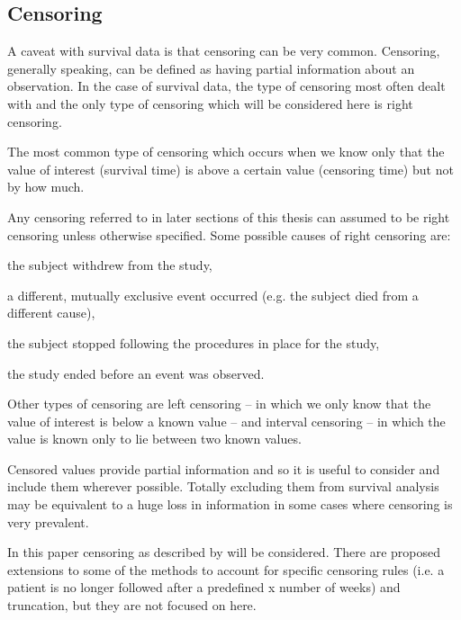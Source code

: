 \subsection{Censoring}\label{intro-censoring}

A caveat with survival data is that censoring can be very common. Censoring, generally speaking, can be defined as having partial information about an observation. In the case of survival data, the type of censoring most often dealt with and the only type of censoring which will be considered here is right censoring.

\begin{definition}\label{right-censoring}
The most common type of censoring which occurs when we know only that the value of interest (survival time) is above a certain value (censoring time) but not by how much.
\end{definition}

Any censoring referred to in later sections of this thesis can assumed to be right censoring unless otherwise specified. Some possible causes of right censoring are:
\begin{itemize}
\begin{spacing}{0}
    \item the subject withdrew from the study,
    \item a different, mutually exclusive event occurred (e.g. the subject died from a different cause),
    \item the subject stopped following the procedures in place for the study,
    \item the study ended before an event was observed.
\end{spacing}
\end{itemize}

Other types of censoring are left censoring -- in which we only know that the value of interest is below a known value -- and interval censoring -- in which the value is known only to lie between two known values.

Censored values provide partial information and so it is useful to consider and include them wherever possible. Totally excluding them from survival analysis may be equivalent to a huge loss in information in some cases where censoring is very prevalent.

In this paper censoring as described by  will be considered. There are proposed extensions to some of the methods to account for specific censoring rules (i.e. a patient is no longer followed after a predefined x number of weeks) and truncation, but they are not focused on here. 


